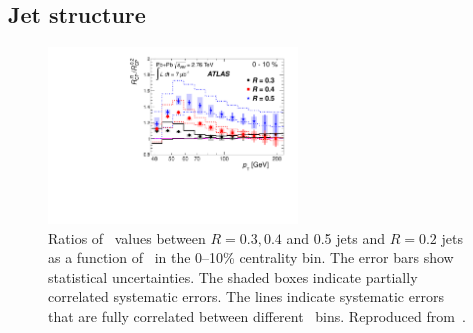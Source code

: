 \subsection{Jet structure}

\begin{figure}[!th]
\includegraphics[width=0.59\textwidth]{jetfigures/ATLAS_jetRCP_size.pdf}
\begin{center}
\caption{
Ratios of \Rcp\ values between $R = 0.3, 0.4$ and 0.5 jets and $R =
0.2$ jets as a function of \pT\ in the 0--10\% centrality bin. The
error bars show statistical uncertainties. The shaded boxes
indicate partially correlated systematic errors. The lines indicate
systematic errors that are fully correlated between different \pT\ bins.
Reproduced from~\cite{Aad:2012is}.
}
\label{fig:GR:ATLAS_jet_v2}
\end{center}
\end{figure}

